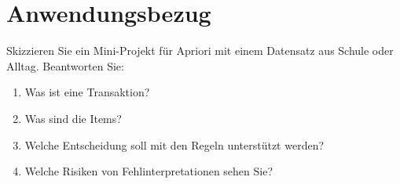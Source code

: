 \section{Anwendungsbezug}

\begin{mychallenge}
    Skizzieren Sie ein Mini-Projekt für Apriori mit einem Datensatz aus Schule oder Alltag.
    Beantworten Sie:
    \begin{enumerate}
        \item Was ist eine Transaktion?
        \item Was sind die Items?
        \item Welche Entscheidung soll mit den Regeln unterstützt werden?
        \item Welche Risiken von Fehlinterpretationen sehen Sie?
    \end{enumerate}
\end{mychallenge}
